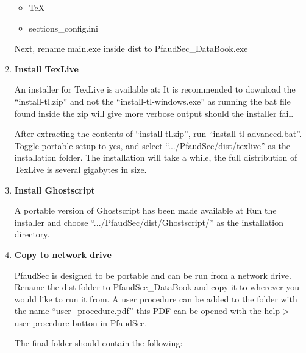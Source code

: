 \documentclass[14pt]{article}
\newcommand{\chref}[3][black]{\href{#2}{\color{#1}{#3}}}%
\newcommand{\ifolder}{\item[\faFolderOpen]}
\newcommand{\ifile}{\item[\faFileText]}
\begin{document}
\begin{flushleft}
\begin{enumerate}
\begin{tcolorbox}[boxrule=0.5pt, colback=backgrey, colframe=bordergrey, sharpish corners] 
\begin{itemize}[labelsep = 1.5em, align=center]%

\ifolder TeX
\ifile sections\_config.ini

\end{itemize}
\end{tcolorbox}

Next, rename main.exe inside dist to PfaudSec\_DataBook.exe

\item \textbf{Install TexLive}

An installer for TexLive is available at:
\chref[pfblue]
{https://www.tug.org/texlive/acquire-netinstall.html}
{https://www.tug.org/texlive/acquire-netinstall.html}
It is recommended to download the
``install-tl.zip'' and not the ``install-tl-windows.exe''
as running the bat file found inside the zip will give more verbose output should the installer fail.

After extracting the contents of ``install-tl.zip'', run ``install-tl-advanced.bat''.
Toggle portable setup to yes, and select ``.../PfaudSec/dist/texlive'' as the installation folder.
The installation will take a while, the full distribution of TexLive is several gigabytes in size.

\item \textbf{Install Ghostscript}

A portable version of Ghostscript has been made available at
\chref[pfblue]
{https://portableapps.com/apps/utilities/ghostscript_portable}
{https://portableapps.com/apps/utilities/ghostscript\_portable}
Run the installer and choose ``.../PfaudSec/dist/Ghostscript/'' as the installation directory.

\item \textbf{Copy to network drive}

PfaudSec is designed to be portable and can be run from a network drive.
Rename the dist folder to PfaudSec\_DataBook and copy it to wherever you would like to run it from.
A user procedure can be added to the folder with the name ``user\_procedure.pdf'' this PDF can be opened with the help > user procedure button in PfaudSec.

The final folder should contain the following:

\begin{tcolorbox}[boxrule=0.5pt, colback=backgrey, colframe=bordergrey, sharpish corners] 


\end{tcolorbox}
\end{enumerate}
\end{flushleft}
\end{document}
